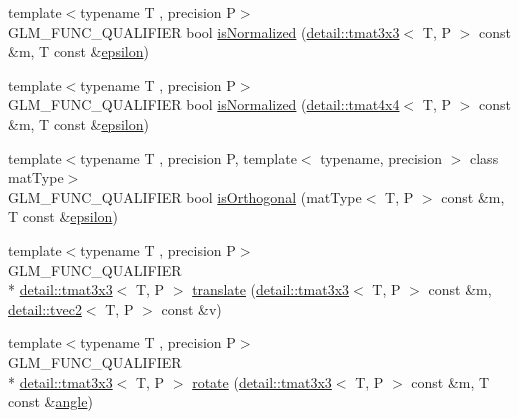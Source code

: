 \begin{DoxyCompactItemize}
\item 
{\footnotesize template$<$typename T , precision P$>$ }\\G\-L\-M\-\_\-\-F\-U\-N\-C\-\_\-\-Q\-U\-A\-L\-I\-F\-I\-E\-R bool \hyperlink{group__gtx__matrix__query_gab4c4106cd851951bad5e78a83bfc75dd}{is\-Normalized} (\hyperlink{structglm_1_1detail_1_1tmat3x3}{detail\-::tmat3x3}$<$ T, P $>$ const \&m, T const \&\hyperlink{group__gtc__constants_gacb41049b8d22c8aa90e362b96c524feb}{epsilon})
\item 
{\footnotesize template$<$typename T , precision P$>$ }\\G\-L\-M\-\_\-\-F\-U\-N\-C\-\_\-\-Q\-U\-A\-L\-I\-F\-I\-E\-R bool \hyperlink{group__gtx__matrix__query_gad0ff11cc2c26d3086d9f88316a321637}{is\-Normalized} (\hyperlink{structglm_1_1detail_1_1tmat4x4}{detail\-::tmat4x4}$<$ T, P $>$ const \&m, T const \&\hyperlink{group__gtc__constants_gacb41049b8d22c8aa90e362b96c524feb}{epsilon})
\item 
{\footnotesize template$<$typename T , precision P, template$<$ typename, precision $>$ class mat\-Type$>$ }\\G\-L\-M\-\_\-\-F\-U\-N\-C\-\_\-\-Q\-U\-A\-L\-I\-F\-I\-E\-R bool \hyperlink{group__gtx__matrix__query_gab2cb5d23df77b4e4e63ad2965acd31b3}{is\-Orthogonal} (mat\-Type$<$ T, P $>$ const \&m, T const \&\hyperlink{group__gtc__constants_gacb41049b8d22c8aa90e362b96c524feb}{epsilon})
\item 
{\footnotesize template$<$typename T , precision P$>$ }\\G\-L\-M\-\_\-\-F\-U\-N\-C\-\_\-\-Q\-U\-A\-L\-I\-F\-I\-E\-R \\*
\hyperlink{structglm_1_1detail_1_1tmat3x3}{detail\-::tmat3x3}$<$ T, P $>$ \hyperlink{group__gtx__matrix__transform__2d_gaa73c0e940e66b4e8aebf9dc72f5a7e34}{translate} (\hyperlink{structglm_1_1detail_1_1tmat3x3}{detail\-::tmat3x3}$<$ T, P $>$ const \&m, \hyperlink{structglm_1_1detail_1_1tvec2}{detail\-::tvec2}$<$ T, P $>$ const \&v)
\item 
{\footnotesize template$<$typename T , precision P$>$ }\\G\-L\-M\-\_\-\-F\-U\-N\-C\-\_\-\-Q\-U\-A\-L\-I\-F\-I\-E\-R \\*
\hyperlink{structglm_1_1detail_1_1tmat3x3}{detail\-::tmat3x3}$<$ T, P $>$ \hyperlink{group__gtx__matrix__transform__2d_gae172cd1e33a5c7b82c69a9731eac6c67}{rotate} (\hyperlink{structglm_1_1detail_1_1tmat3x3}{detail\-::tmat3x3}$<$ T, P $>$ const \&m, T const \&\hyperlink{group__gtc__quaternion_ga23a3fc7ada5bbb665ff84c92c6e0542c}{angle})
\item 

\end{DoxyCompactItemize}
